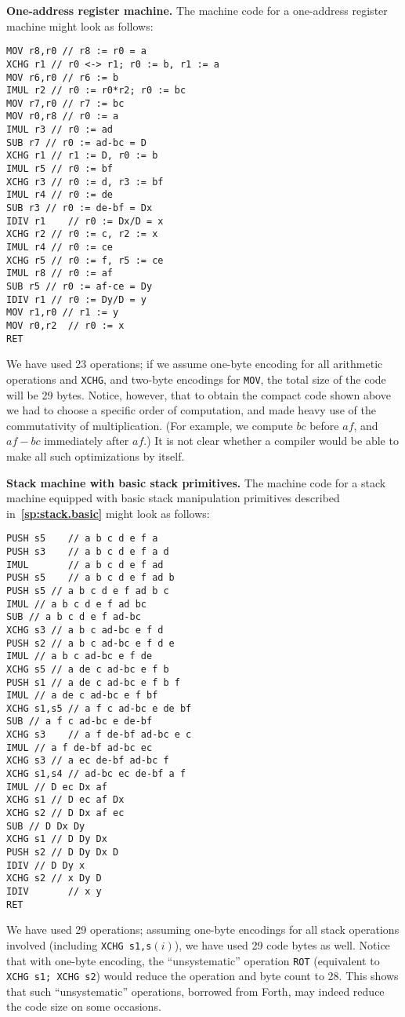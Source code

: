 \documentclass[12pt,oneside]{article}
\def\makepoint#1{\medbreak\noindent{\bf #1.\ }}
\def\nxsubpoint{\refstepcounter{subsubsection}%
    \smallbreak\makepoint{\thesubsubsection}}
\def\refpoint#1{{\rm\textbf{\ref{#1}}}}
\let\ptref=\refpoint
\def\emb#1{\textbf{#1.}}
\begin{document}
\nxsubpoint\label{sp:cmp1.1addr}\emb{One-address register machine}
The machine code for a one-address register machine might look as follows:
\begin{verbatim}
MOV r8,r0 // r8 := r0 = a
XCHG r1 // r0 <-> r1; r0 := b, r1 := a
MOV r6,r0 // r6 := b
IMUL r2 // r0 := r0*r2; r0 := bc
MOV r7,r0 // r7 := bc
MOV r0,r8 // r0 := a
IMUL r3 // r0 := ad
SUB r7 // r0 := ad-bc = D
XCHG r1 // r1 := D, r0 := b
IMUL r5 // r0 := bf
XCHG r3 // r0 := d, r3 := bf
IMUL r4 // r0 := de
SUB r3 // r0 := de-bf = Dx
IDIV r1    // r0 := Dx/D = x
XCHG r2 // r0 := c, r2 := x
IMUL r4 // r0 := ce
XCHG r5 // r0 := f, r5 := ce
IMUL r8 // r0 := af
SUB r5 // r0 := af-ce = Dy
IDIV r1 // r0 := Dy/D = y
MOV r1,r0 // r1 := y
MOV r0,r2  // r0 := x
RET
\end{verbatim}
We have used 23 operations; if we assume one-byte encoding for all arithmetic operations and \texttt{XCHG}, and two-byte encodings for \texttt{MOV}, the total size of the code will be 29 bytes. Notice, however, that to obtain the compact code shown above we had to choose a specific order of computation, and made heavy use of the commutativity of multiplication. (For example, we compute $bc$ before $af$, and $af-bc$ immediately after $af$.) It is not clear whether a compiler would be able to make all such optimizations by itself.

\nxsubpoint\label{sp:cmp1.stack.base}
\emb{Stack machine with basic stack primitives}
The machine code for a stack machine equipped with basic stack manipulation primitives described in~\ptref{sp:stack.basic} might look as follows:
\begin{verbatim}
PUSH s5    // a b c d e f a
PUSH s3    // a b c d e f a d
IMUL       // a b c d e f ad
PUSH s5    // a b c d e f ad b
PUSH s5 // a b c d e f ad b c
IMUL // a b c d e f ad bc
SUB // a b c d e f ad-bc
XCHG s3 // a b c ad-bc e f d
PUSH s2 // a b c ad-bc e f d e
IMUL // a b c ad-bc e f de
XCHG s5 // a de c ad-bc e f b
PUSH s1 // a de c ad-bc e f b f
IMUL // a de c ad-bc e f bf
XCHG s1,s5 // a f c ad-bc e de bf
SUB // a f c ad-bc e de-bf
XCHG s3    // a f de-bf ad-bc e c
IMUL // a f de-bf ad-bc ec
XCHG s3 // a ec de-bf ad-bc f
XCHG s1,s4 // ad-bc ec de-bf a f
IMUL // D ec Dx af
XCHG s1 // D ec af Dx
XCHG s2 // D Dx af ec
SUB // D Dx Dy
XCHG s1 // D Dy Dx
PUSH s2 // D Dy Dx D
IDIV // D Dy x
XCHG s2 // x Dy D
IDIV       // x y
RET
\end{verbatim}
We have used 29 operations; assuming one-byte encodings for all stack operations involved (including \texttt{XCHG s1,s$(i)$}), we have used 29 code bytes as well. Notice that with one-byte encoding, the ``unsystematic'' operation \texttt{ROT} (equivalent to \texttt{XCHG s1; XCHG s2}) would reduce the operation and byte count to 28. This shows that such ``unsystematic'' operations, borrowed from Forth, may indeed reduce the code size on some occasions.
\end{document}
